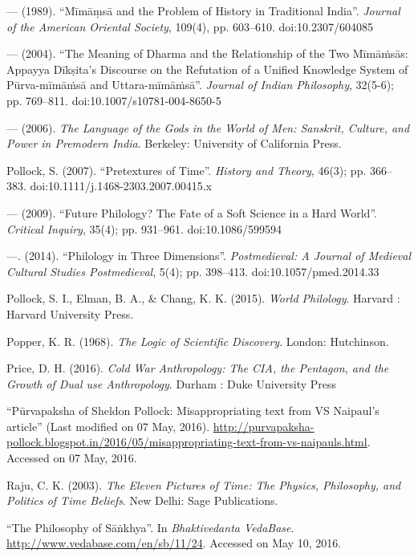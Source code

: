 \begin{thebibliography}{99}
--- (1989). ``Mīmāṃsā and the Problem of History in Traditional India''. {\sl Journal of the American Oriental Society}, 109(4), pp. 603--610. doi:10.2307/604085

--- (2004). ``The Meaning of Dharma and the Relationship of the Two Mīmāṁsās: Appayya Dīkṣita's Discourse on the Refutation of a Unified Knowledge System of Pūrva-mīmāṁsā and Uttara-mīmāṁsā''. {\sl Journal of Indian Philosophy}, 32(5-6); pp. 769--811. doi:10.1007/s10781-004-8650-5

--- (2006). {\sl The Language of the Gods in the World of Men: Sanskrit, Culture, and Power in Premodern India}. Berkeley: University of California Press.

Pollock, S. (2007). ``Pretextures of Time''. {\sl History and Theory}, 46(3); pp. 366--383. doi:10.1111/j.1468-2303.2007.00415.x

--- (2009). ``Future Philology? The Fate of a Soft Science in a Hard World''. {\sl Critical Inquiry}, 35(4); pp. 931--961. doi:10.1086/599594

---. (2014). ``Philology in Three Dimensions''. {\sl Postmedieval: A Journal of Medieval Cultural Studies Postmedieval}, 5(4); pp. 398--413. doi:10.1057/pmed.2014.33

Pollock, S. I., Elman, B. A., \& Chang, K. K. (2015). {\sl World Philology}. Harvard : Harvard University Press.

Popper, K. R. (1968). {\sl The Logic of Scientific Discovery}. London: Hutchinson.

Price, D. H. (2016). {\sl Cold War Anthropology: The CIA, the Pentagon, and the Growth of Dual use Anthropology}. Durham : Duke University Press

``Pūrvapaksha of Sheldon Pollock: Misappropriating text from VS Naipaul's article'' (Last modified on 07 May, 2016). \url{http://purvapaksha-pollock.blogspot.in/2016/05/misappropriating-text-from-vs-naipauls.html}. Accessed on 07 May, 2016.

Raju, C. K. (2003). {\sl The Eleven Pictures of Time: The Physics, Philosophy, and Politics of Time Beliefs}. New Delhi: Sage Publications.

``The Philosophy of Sāṅkhya''. In {\sl Bhaktivedanta VedaBase}. \url{http://www.vedabase.com/en/sb/11/24}. Accessed on May 10, 2016.


\end{thebibliography}
